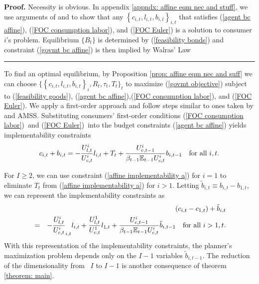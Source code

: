 \documentclass[thmsb,11pt]{article}
\newenvironment{proof}[1][Proof]{\noindent \textbf{#1.} }{\  \rule{0.5em}{0.5em}}
\begin{document}
\begin{proof}
Necessity is obvious. In  appendix   \ref{appndx: affine eqm nec and stuff}, we use arguments of \cite{Magill1994} and \cite{Constantinides1996} to show that any $\left \{
c_{i,t},l_{i,t},b_{i,t}\right \} _{i,t}$ that satisfies (\ref{agent bc
affine}), (\ref{FOC consumption labor}), and (\ref{FOC Euler}) is a solution
to consumer $i$'s  problem. Equilibrium $\{B_{t}\}$ is determined by
(\ref{feasibility bonds}) and constraint (\ref{govmt bc affine}) is then
implied by Walras' Law
\end{proof}

To find an optimal equilibrium, by Proposition  \ref{prop: affine eqm nec and suff}
we can choose $\{ \left \{ c_{i,t},l_{i,t},b_{i,t}\right \} _{i},R_{t},\tau
_{t},T_{t}\}_{t}$ to maximize (\ref{govmt objective}) subject to (\ref{feasibility goods}), (\ref{agent bc affine}),(\ref{FOC consumption labor}), and (\ref{FOC Euler}).
We  apply a first-order approach and follow steps similar to ones taken by \cite{LucasJr.1983} and AMSS.
 Substituting consumers' first-order
conditions (\ref{FOC consumption labor})\ and (\ref{FOC Euler})\ into the
budget constraints (\ref{agent bc affine}) yields implementability
constraints%
\begin{equation}
c_{i,t}+b_{i,t}=-\frac{U_{l,t}^{i}}{U_{c,t}^{i}}l_{i,t}+T_{t}+\frac{%
U_{c,t-1}^{i}}{\beta_{t-1} \mathbb{E}_{t-1}U_{c,t}^{i}}b_{i,t-1}\ \text{for\ all\ }%
i,t.  \label{affine implementability a}
\end{equation}

\noindent For $I\geq 2$, we can use constraint (\ref{affine implementability
a}) for  $i=1$ to eliminate $T_{t}$ from (\ref{affine implementability a}) for $i > 1$. Letting $\tilde{b}%
_{i,t}\equiv b_{i,t}-b_{1,t}$, we can represent the implementability constraints
as
\begin{eqnarray}
&&\left( c_{i,t}-c_{1,t}\right) +\tilde{b}_{i,t}
\label{affine implementability b} \\
&=&-\frac{U_{l,t}^{i}}{U_{c,t}^{i}}_{i,t}l_{i,t}+\frac{U^1_{l,t}}{U^1_{c,t}}l_{1,t} +\frac{U_{c,t-1}^{i}}{\beta_{t-1} \mathbb{E}%
_{t-1}U_{c,t}^{i}}\tilde{b}_{i,t-1}\ \text{for\ all\ }i>1,t.  \notag
\end{eqnarray}
\noindent With this representation of the implementability constraints, the planner's
maximization problem depends only on the $I-1$ variables $\tilde{b}_{i,t-1}.$
The reduction of  the dimensionality from \ $I$ to $I-1$ is
 another consequence of theorem \ref{theorem: main}.
\end{document}

